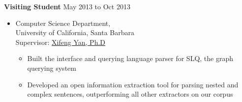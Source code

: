 \documentclass[10pt]{article}
\newenvironment{outerlist}[1][\enskip\textbullet]%
        {\begin{itemize}[#1,leftmargin=*]}{\end{itemize}%
         \vspace{-.6\baselineskip}}
\newenvironment{innerlist}[1][\enskip\textbullet]%
        {\begin{itemize}[#1,leftmargin=*,parsep=0pt,itemsep=0pt,topsep=0pt,partopsep=0pt]}
        {\end{itemize}}
\begin{document}
\textbf{Visiting Student} \hfill {May 2013 to Oct 2013}
\begin{outerlist}
\item[] Computer Science Department,\\
        University of California, Santa Barbara\\
        Supervisor: \href{http://www.cs.ucsb.edu/~xyan/}
                   {Xifeng Yan, Ph.D}
        \begin{innerlist}
        \item Built the interface and querying language parser for SLQ, the graph querying system
        \item Developed an open information extraction tool for parsing nested and complex sentences, outperforming all other extractors on our corpus
        \end{innerlist}
\end{outerlist}
\end{document}
